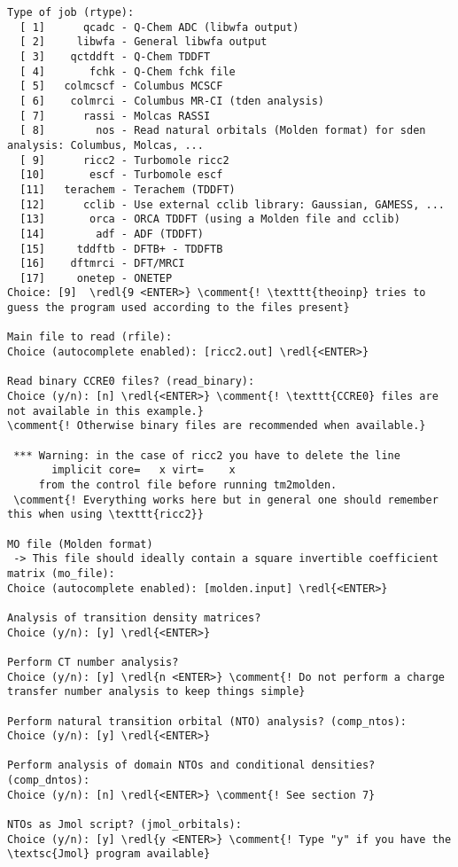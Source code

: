 \documentclass[DIV=12,headings=normal]{scrartcl}
\newcommand{\comment}[1]{\textcolor{blue}{#1}}
\newcommand{\redl}[1]{{\textcolor{red}{\underline{#1}}}}
\newcounter{number}
\begin{document}
\scriptsize
\begin{Verbatim}[commandchars=\\\{\}]
Type of job (rtype):
  [ 1]      qcadc - Q-Chem ADC (libwfa output)
  [ 2]     libwfa - General libwfa output
  [ 3]    qctddft - Q-Chem TDDFT
  [ 4]       fchk - Q-Chem fchk file
  [ 5]   colmcscf - Columbus MCSCF
  [ 6]    colmrci - Columbus MR-CI (tden analysis)
  [ 7]      rassi - Molcas RASSI
  [ 8]        nos - Read natural orbitals (Molden format) for sden analysis: Columbus, Molcas, ...
  [ 9]      ricc2 - Turbomole ricc2
  [10]       escf - Turbomole escf
  [11]   terachem - Terachem (TDDFT)
  [12]      cclib - Use external cclib library: Gaussian, GAMESS, ...
  [13]       orca - ORCA TDDFT (using a Molden file and cclib)
  [14]        adf - ADF (TDDFT)
  [15]     tddftb - DFTB+ - TDDFTB
  [16]    dftmrci - DFT/MRCI
  [17]     onetep - ONETEP
Choice: [9]  \redl{9 <ENTER>} \comment{! \texttt{theoinp} tries to guess the program used according to the files present}

Main file to read (rfile):
Choice (autocomplete enabled): [ricc2.out] \redl{<ENTER>}

Read binary CCRE0 files? (read_binary):
Choice (y/n): [n] \redl{<ENTER>} \comment{! \texttt{CCRE0} files are not available in this example.}
\comment{! Otherwise binary files are recommended when available.}

 *** Warning: in the case of ricc2 you have to delete the line
       implicit core=   x virt=    x
     from the control file before running tm2molden.
 \comment{! Everything works here but in general one should remember this when using \texttt{ricc2}}

MO file (Molden format)
 -> This file should ideally contain a square invertible coefficient matrix (mo_file):
Choice (autocomplete enabled): [molden.input] \redl{<ENTER>}

Analysis of transition density matrices?
Choice (y/n): [y] \redl{<ENTER>}

Perform CT number analysis?
Choice (y/n): [y] \redl{n <ENTER>} \comment{! Do not perform a charge transfer number analysis to keep things simple}

Perform natural transition orbital (NTO) analysis? (comp_ntos):
Choice (y/n): [y] \redl{<ENTER>}

Perform analysis of domain NTOs and conditional densities? (comp_dntos):
Choice (y/n): [n] \redl{<ENTER>} \comment{! See section 7}

NTOs as Jmol script? (jmol_orbitals):
Choice (y/n): [y] \redl{y <ENTER>} \comment{! Type "y" if you have the \textsc{Jmol} program available}


\end{Verbatim}
\end{document}
